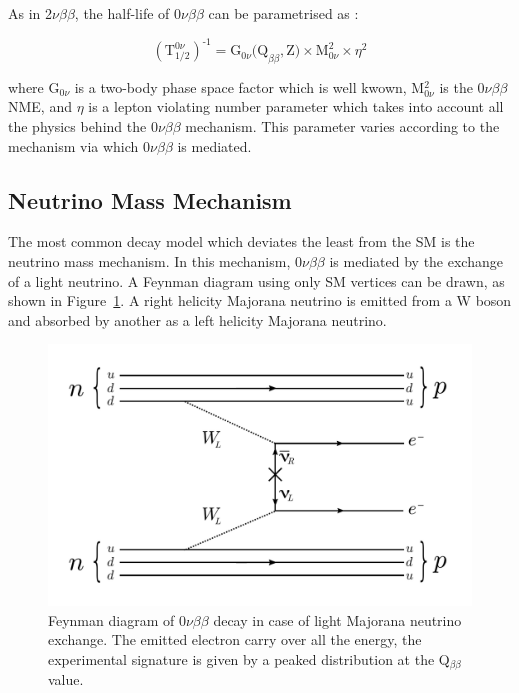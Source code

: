 \documentclass[main.tex]{subfiles}
\begin{document}
\bigskip


\NI As in 2$\nu\beta\beta$, the half-life of 0$\nu\beta\beta$ can be parametrised as : 


\begin{equation}\label{eq:halflife0nu}
(\text{T}_{\text{1/2}}^{\text{0}\nu})^{\text{-1}} = \text{G}_{\text{0}\nu}\text{(Q}_{\beta\beta},\text{Z)} \times \text{M}^\text{2}_{\text{0}\nu} \times \eta^\text{2}
\end{equation}


\bigskip


\NI where G$_{\text{0}\nu}$ is a two-body phase space factor which is well kwown, M$^\text{2}_{\text{0}\nu}$ is the 0$\nu\beta\beta$ NME, and $\eta$ is a lepton violating number parameter which takes into account all the physics behind the 0$\nu\beta\beta$ mechanism. This parameter varies according to the mechanism via which 0$\nu\beta\beta$ is mediated.  


\FloatBarrier


\subsection{Neutrino Mass Mechanism}\label{sec:NMM}



\NI The most common decay model which deviates the least from the SM is the neutrino mass mechanism. In this mechanism, 0$\nu\beta\beta$ is mediated by the exchange of a light neutrino. A Feynman diagram using only SM vertices can be drawn, as shown in Figure~\ref{0nubbNMM}. A right helicity Majorana neutrino is emitted from a W boson and absorbed by another as a left helicity Majorana neutrino. 


\begin{figure}[h!]
\begin{center}
\includegraphics[scale=0.5]{pictures/Chap2/0nubbFeynmanDiagram_NMM.pdf}
\caption{Feynman diagram of 0$\nu\beta\beta$ decay in case of light Majorana neutrino exchange. The emitted electron carry over all the energy, the experimental signature is given by a peaked distribution at the Q$_{\beta\beta}$ value.}
\label{0nubbNMM}
\end{center}
\end{figure}
\end{document}
